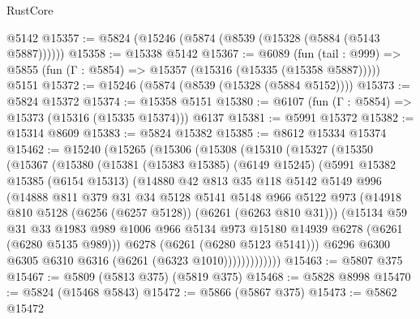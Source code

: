 \begin{lexlean}{RustCore}
\begin{coremodule}
    @5142
@15357 := @5824 (@15246 (@5874 (@8539 (@15328 (@5884 (@5143 @5887))))))
@15358 := @15338 @5142
@15367 := @6089
    (fun (tail : @999) => @5855 (fun (Γ : @5854) => @15357 (@15316 (@15335 (@15358 @5887)))))
    @5151
@15372 := @15246 (@5874 (@8539 (@15328 (@5884 @5152))))
@15373 := @5824 @15372
@15374 := @15358 @5151
@15380 := @6107 (fun (Γ : @5854) => @15373 (@15316 (@15335 @15374))) @6137
@15381 := @5991 @15372
@15382 := @15314 @8609
@15383 := @5824 @15382
@15385 := @8612 @15334 @15374
@15462 := @15240
    (@15265
      (@15306
        (@15308
          (@15310
            (@15327
              (@15350
                (@15367
                  (@15380
                    (@15381
                      (@15383 @15385)
                      (@6149 @15245)
                      (@5991
                        @15382
                        @15385
                        (@6154 @15313)
                        (@14880
                          @42
                          @813
                          @35
                          @118
                          @5142
                          @5149
                          @996
                          (@14888
                            @811
                            @379
                            @31
                            @34
                            @5128
                            @5141
                            @5148
                            @966
                            @5122
                            @973
                            (@14918 @810 @5128 (@6256 (@6257 @5128)) (@6261 (@6263 @810 @31)))
                            (@15134
                              @59
                              @31
                              @33
                              @1983
                              @989
                              @1006
                              @966
                              @5134
                              @973
                              @15180
                              @14939
                              @6278
                              (@6261 (@6280 @5135 @989)))
                            @6278
                            (@6261 (@6280 @5123 @5141)))
                          @6296
                          @6300
                          @6305
                          @6310
                          @6316
                          (@6261 (@6323 @1010)))))))))))))
@15463 := @5807 @375
@15467 := @5809 (@5813 @375) (@5819 @375)
@15468 := @5828 @8998
@15470 := @5824 (@15468 @5843)
@15472 := @5866 (@5867 @375)
@15473 := @5862 @15472

\end{coremodule}
\end{lexlean}
